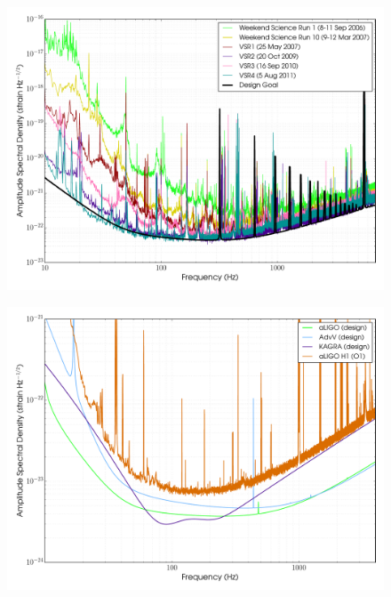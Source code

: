 \documentclass{article}
\begin{document}
\begin{figure}[]
\begin{center}
\includegraphics[width=1\columnwidth]{./figures/VirgoSrunASDs/VirgoSrunASDs}
\caption{ \protect}
\end{center}
\end{figure}


\begin{figure}[]
\begin{center}
\includegraphics[width=1\columnwidth]{./figures/advcurves/advcurves}
\caption{ \protect}
\end{center}
\end{figure}
\end{document}
